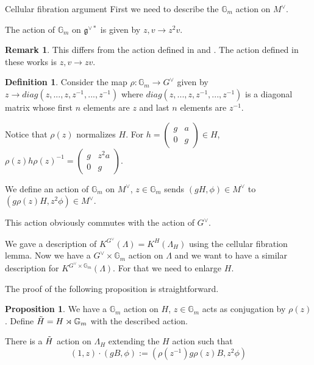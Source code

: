\documentclass[12pt]{article}
\newcommand{\<}{\langle}
\renewcommand{\>}{\rangle}
\theoremstyle{plain}
\theoremstyle{definition}
\newtheorem{prop}[theorem]{Proposition}
\newtheorem{Remark}[theorem]{Remark}
\newtheorem{defn}[theorem]{Definition}
\begin{document}
\begin{section}{Cellular fibration argument}
First we need to describe the $\mathbb{G}_m$ action on $M^\vee$.

The action of $\mathbb{G}_m$ on $\mathfrak{g}^{\vee*}$ is given by $z,v\rightarrow z^2v$.  

\begin{Remark}\label{linear action}
    This differs from the action defined in \cite{Chriss1997RepresentationTA} and \cite{Kazhdan1987ProofOT}. The action defined in these works is $z,v\rightarrow zv$. 
\end{Remark}

\begin{defn}
    Consider the map $\rho:\mathbb{G}_m\rightarrow G^\vee$ given by $z\rightarrow diag(z,...,z,z^{-1},...,z^{-1})$ where $diag(z,...,z,z^{-1},...,z^{-1})$ is a diagonal matrix whose first $n$ elements are $z$ and last $n$ elements are $z^{-1}$.
    
    Notice that $\rho(z)$ normalizes $H$. For $h=\begin{pmatrix}
        g & a  \\
        0 & g
        \end{pmatrix}\in H$,  $\rho(z)h\rho(z)^{-1}=\begin{pmatrix}
        g & z^2a  \\
        0 & g
        \end{pmatrix}$. 

    We define an action of $\mathbb{G}_m$ on $M^\vee$, $z\in \mathbb{G}_m$ sends $(gH,\phi)\in M^\vee$ to $(g\rho(z)H,z^2\phi)\in M^\vee$.

    This action obviously commutes with the action of $G^\vee$.
\end{defn}

We gave a description of $K^{G^\vee}(\Lambda)=K^H(\Lambda_H)$ using the cellular fibration lemma. Now we have a $G^\vee\times\mathbb{G}_m$ action on $\Lambda$ and we want to have a similar description for $K^{G^\vee\times\mathbb{G}_m}(\Lambda)$. For that we need to enlarge $H$. 

The proof of the following proposition is straightforward.


\begin{prop}\label{semi direct product}
    We have a $\mathbb{G}_m$ action on $H$, $z\in \mathbb{G}_m$ acts as conjugation by $\rho(z)$. Define $\Tilde{H}=H\rtimes \mathbb{G}_m$ with the described action. 

    There is a $\Tilde{H}$ action on $\Lambda_H$ extending the $H$ action such that $$(1,z)\cdot(gB,\phi):=(\rho(z^{-1})g\rho(z)B,z^2\phi)$$


\end{prop}
\end{section}
\end{document}
